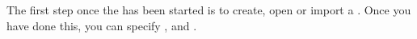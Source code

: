  The first step once the \ite{} has been started is to create, 
open or import a \gdproject{}. Once you have done this, 
you can specify \gdsuites{}, \gdcases{} and \gdsteps{}.
